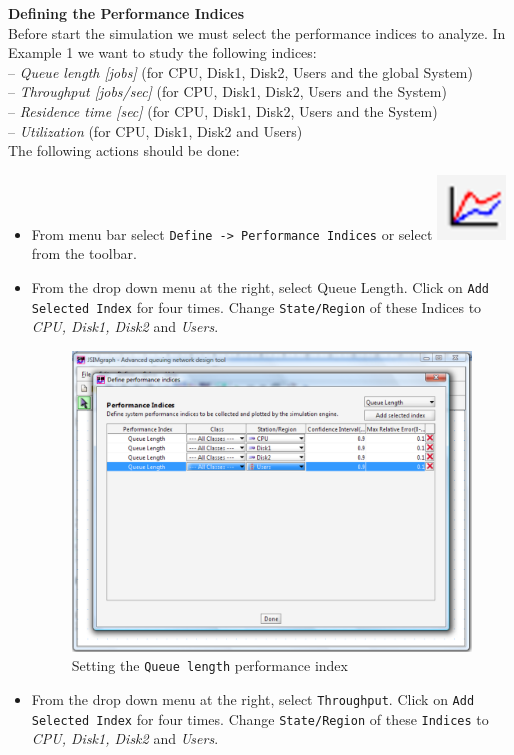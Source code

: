 \noindent \textbf{Defining the Performance Indices}\\
 Before start the
simulation we must select the performance indices to analyze. In
Example 1 we want to study the following
indices:\\
-- \emph{Queue length [jobs]} (for CPU, Disk1, Disk2, Users and
the global System)\\
-- \emph{Throughput [jobs/sec]} (for CPU, Disk1, Disk2, Users and
the System)\\
-- \emph{Residence time [sec]} (for CPU, Disk1, Disk2, Users and
the System)\\
-- \emph{Utilization} (for CPU, Disk1, Disk2 and Users)\\

\noindent The following actions should be done:
\begin{itemize}
\item From menu bar select \texttt{Define -> Performance Indices}
or select
\includegraphics[scale=.5]{img/jsimg/defineperformanceindices.eps}
from the toolbar. \item From the drop down menu at the right,
select Queue Length. Click on \texttt{Add Selected Index} for four
times. Change \texttt{State/Region} of these Indices to \emph{CPU,
Disk1, Disk2} and \emph{Users}.
\begin{figure}[htb]
    \begin{center}
        \includegraphics[scale=.5]{img/jsimg/12.11.eps}
    \end{center}
    \caption{Setting the \texttt{Queue length} performance index}
    \label{fig:qlperfind}
\end{figure}
\item From the drop down menu at the right, select
\texttt{Throughput}. Click on \texttt{Add Selected Index} for four
times. Change \texttt{State/Region} of these \texttt{Indices} to
\emph{CPU, Disk1, Disk2} and \emph{Users}.


\end{itemize}
